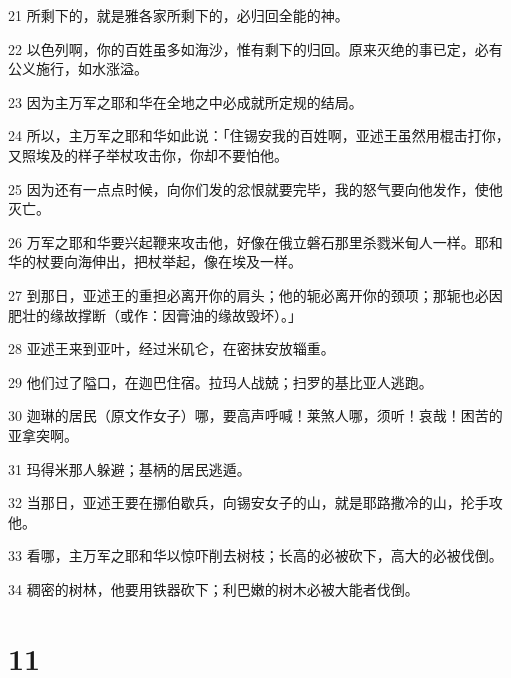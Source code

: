 \par 21 所剩下的，就是雅各家所剩下的，必归回全能的神。
\par 22 以色列啊，你的百姓虽多如海沙，惟有剩下的归回。原来灭绝的事已定，必有公义施行，如水涨溢。
\par 23 因为主万军之耶和华在全地之中必成就所定规的结局。
\par 24 所以，主万军之耶和华如此说：「住锡安我的百姓啊，亚述王虽然用棍击打你，又照埃及的样子举杖攻击你，你却不要怕他。
\par 25 因为还有一点点时候，向你们发的忿恨就要完毕，我的怒气要向他发作，使他灭亡。
\par 26 万军之耶和华要兴起鞭来攻击他，好像在俄立磐石那里杀戮米甸人一样。耶和华的杖要向海伸出，把杖举起，像在埃及一样。
\par 27 到那日，亚述王的重担必离开你的肩头；他的轭必离开你的颈项；那轭也必因肥壮的缘故撑断（或作：因膏油的缘故毁坏）。」
\par 28 亚述王来到亚叶，经过米矶仑，在密抹安放辎重。
\par 29 他们过了隘口，在迦巴住宿。拉玛人战兢；扫罗的基比亚人逃跑。
\par 30 迦琳的居民（原文作女子）哪，要高声呼喊！莱煞人哪，须听！哀哉！困苦的亚拿突啊。
\par 31 玛得米那人躲避；基柄的居民逃遁。
\par 32 当那日，亚述王要在挪伯歇兵，向锡安女子的山，就是耶路撒冷的山，抡手攻他。
\par 33 看哪，主万军之耶和华以惊吓削去树枝；长高的必被砍下，高大的必被伐倒。
\par 34 稠密的树林，他要用铁器砍下；利巴嫩的树木必被大能者伐倒。

\chapter{11}

